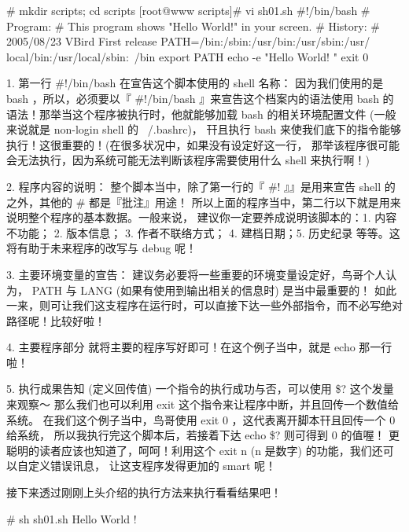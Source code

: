 \begin{Code}
	# mkdir scripts; cd scripts 
	[root@www scripts]# vi sh01.sh 
	#!/bin/bash 
	# Program: 
	# This program shows "Hello World!" in your screen. 
	# History: 
	# 2005/08/23 VBird First release 
	PATH=/bin:/sbin:/usr/bin:/usr/sbin:/usr/
	local/bin:/usr/local/sbin:~/bin export 
	PATH 
	echo -e "Hello World! \a \n" exit 0


1. 第一行 #!/bin/bash 在宣告这个脚本使用的 shell 名称： 因为我们使用的是 bash ，所以，必须要以『 #!/bin/bash 』来宣告这个档案内的语法使用 bash 的语法！那举当这个程序被执行时，他就能够加载 bash 的相关环境配置文件 (一般来说就是 non-login shell 的 ~/.bashrc)， 幵且执行 bash 来使我们底下的指令能够执行！这很重要的！(在很多状况中，如果没有设定好这一行， 那举该程序很可能会无法执行，因为系统可能无法判断该程序需要使用什么 shell 来执行啊！)

2. 程序内容的说明： 整个脚本当中，除了第一行的『 #! 』』是用来宣告 shell 的之外，其他的 # 都是『批注』用途！ 所以上面的程序当中，第二行以下就是用来说明整个程序的基本数据。一般来说， 建议你一定要养成说明该脚本的：1. 内容不功能； 2. 版本信息； 3. 作者不联络方式； 4. 建档日期；5. 历史纪录 等等。这将有助于未来程序的改写与 debug 呢！

3. 主要环境变量的宣告： 建议务必要将一些重要的环境变量设定好，鸟哥个人认为， PATH 与 LANG (如果有使用到输出相关的信息时) 是当中最重要的！ 如此一来，则可让我们这支程序在运行时，可以直接下达一些外部指令，而不必写绝对路径呢！比较好啦！

4. 主要程序部分 就将主要的程序写好即可！在这个例子当中，就是 echo 那一行啦！

5. 执行成果告知 (定义回传值) 
一个指令的执行成功与否，可以使用 \$? 这个发量来观察～ 那么我们也可以利用 exit 这个指令来让程序中断，并且回传一个数值给系统。 在我们这个例子当中，鸟哥使用 exit 0 ，这代表离开脚本幵且回传一个 0 给系统， 所以我执行完这个脚本后，若接着下达 echo \$? 则可得到 0 的值喔！ 更聪明的读者应该也知道了，呵呵！利用这个 exit n (n 是数字) 的功能，我们还可以自定义错误讯息， 让这支程序发得更加的 smart 呢！

\end{Code}
接下来透过刚刚上头介绍的执行方法来执行看看结果吧！
\begin{Code}
	# sh sh01.sh
	Hello World !
\end{Code}

